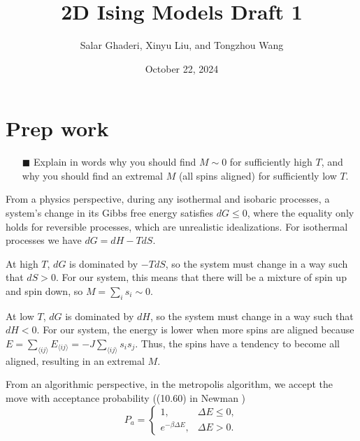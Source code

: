 \documentclass[11pt]{article}
\title{2D Ising Models Draft 1}
\author{Salar Ghaderi, Xinyu Liu, and Tongzhou Wang}
\date{October 22, 2024}
\begin{document}
\maketitle


\section{Prep work}
\begin{itemize}
    \item[$\blacksquare$] Explain in words why you should find $M \sim 0$ for sufficiently high $T$, and why you should find an extremal $M$ (all spins aligned) for sufficiently low $T$.
\end{itemize}
From a physics perspective, during any isothermal and isobaric processes, a system's change in its Gibbs free energy satisfies $dG \leq 0$, where the equality only holds for reversible processes, which are unrealistic idealizations. For isothermal processes we have $dG = dH - TdS$.

At high $T$, $dG$ is dominated by $-TdS$, so the system must change in a way such that $dS > 0$. For our system, this means that there will be a mixture of spin up and spin down, so $M = \sum_i s_i \sim 0$.

At low $T$, $dG$ is dominated by $dH$, so the system must change in a way such that $dH < 0$. For our system, the energy is lower when more spins are aligned because $E = \sum_{\langle ij \rangle} E_{\langle ij \rangle} = -J \sum_{\langle ij \rangle} s_i s_j$. Thus, the spins have a tendency to become all aligned, resulting in an extremal $M$.

From an algorithmic perspective, in the metropolis algorithm, we accept the move with acceptance probability ((10.60) in Newman \cite{newman2013computational})
\begin{equation}\label{acceptprob}
    P_a = \begin{cases}
        1, & \Delta E \leq 0, \\
        e^{-\beta \Delta E}, & \Delta E > 0.
    \end{cases}
\end{equation}
\end{document}
